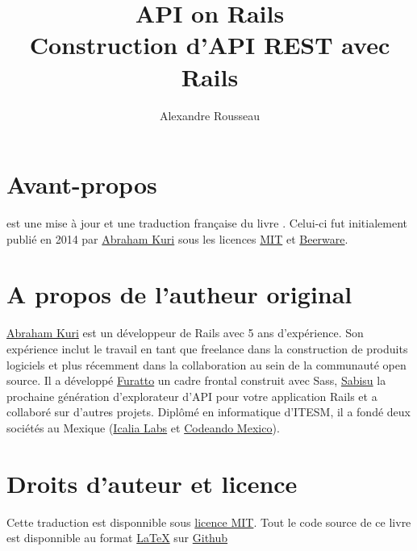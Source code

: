 \documentclass[]{report}
\title{\textbf{API on Rails}\\ Construction d'API REST avec Rails}
\author{Alexandre Rousseau}
\begin{document}
\maketitle
\newpage
\tableofcontents
\newpage
{}

\section{Avant-propos}

   est une mise à jour et une traduction française du livre \href{http://apionrails.icalialabs.com/book/}{}. Celui-ci fut initialement publié en 2014 par \href{https://twitter.com/kurenn}{Abraham Kuri} sous les licences \href{http://opensource.org/licenses/MIT}{MIT} et \href{http://people.freebsd.org/~phk/}{Beerware}.

  \section{A propos de l'autheur original}

    \href{https://twitter.com/kurenn}{Abraham Kuri} est un développeur de Rails avec 5 ans d'expérience. Son expérience inclut le travail en tant que freelance dans la construction de produits logiciels et plus récemment dans la collaboration au sein de la communauté open source. Il a développé \href{http://icalialabs.github.io/furatto/}{Furatto} un cadre frontal construit avec Sass, \href{https://github.com/IcaliaLabs/sabisu-rails}{Sabisu} la prochaine génération d'explorateur d'API pour votre application Rails et a collaboré sur d'autres projets. Diplômé en informatique d'ITESM, il a fondé deux sociétés au Mexique (\href{http://icalialabs.com/}{Icalia Labs} et \href{http://codeandomexico.org/}{Codeando Mexico}).

  \section{Droits d'auteur et licence}

    Cette traduction est disponnible sous \href{http://opensource.org/licenses/MIT}{licence MIT}. Tout le code source de ce livre est disponnible au format \href{https://fr.wikipedia.org/wiki/LaTeX}{\LaTeX} sur \href{https://github.com/madeindjs/api_on_rails}{Github}
\end{document}
